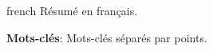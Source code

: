 \begin{resumo}[Résumé]
    \vspace{\onelineskip}
    \begin{otherlanguage*}{french}
    Résumé en français.
 
    \vspace{\onelineskip}
    \noindent\textbf{Mots-clés}: Mots-clés séparés par points.
 \end{otherlanguage*}
\end{resumo}
